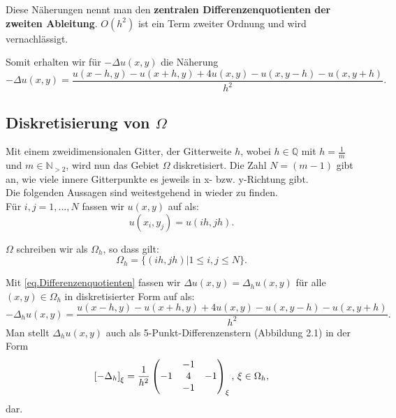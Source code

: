 Diese Näherungen nennt man den \textbf{zentralen Differenzenquotienten der zweiten Ableitung}. $O(h^{2})$ ist ein Term zweiter Ordnung und wird vernachlässigt.

Somit erhalten wir für $-\Delta u(x,y)$ die Näherung
\begin{equation}
-\Delta u(x,y) = \frac {u(x-h,y) - u(x+h,y) + 4u(x,y) - u(x,y-h) - u(x,y+h)} {h^{2}}.\label{eq.Differenzenquotienten}
\end{equation}

\subsection{Diskretisierung von $\Omega$}\label{ss.Diskretisierung}

Mit einem zweidimensionalen Gitter, der Gitterweite $h$, wobei $h \in \mathbb{Q}$ mit $h = \frac {1} {m}$ und $m \in \mathbb{N}_{>2}$, wird nun das Gebiet $\Omega$ diskretisiert. Die Zahl $N = (m-1)$ gibt an, wie viele innere Gitterpunkte es jeweils in x- bzw. y-Richtung gibt.\\
Die folgenden Aussagen sind weitestgehend in \cite[S. 470-472]{DR08} wieder zu finden.\\

Für $i,j = 1,...,N$ fassen wir $u(x,y)$ auf als:
\begin{equation}
u(x_{i},y_{j}) = u(ih,jh).
\end{equation}

$\Omega$ schreiben wir als $\Omega_{h}$, so dass gilt:
\begin{equation}
\Omega_{h} = \{(ih, jh) | 1 \le i,j \le N\}.
\end{equation}

\label{img.5-Point-Star}

Mit \autoref{eq.Differenzenquotienten} fassen wir $\Delta u(x,y) = \Delta_{h} u(x,y)$ für alle $(x,y) \in \Omega_{h}$ in diskretisierter Form auf als:
\begin{equation}
-\Delta_{h} u(x,y) = \frac {u(x-h,y) - u(x+h,y) + 4u(x,y) - u(x,y-h) - u(x,y+h)} {h^{2}}.\label{eq.5-Point-Star}
\end{equation}
Man stellt $\Delta_{h} u(x,y)$ auch als 5-Punkt-Differenzenstern (Abbildung 2.1) in der Form
\begin{equation}
\left[-\Delta_{h}\right]_{\xi} = \frac {1} {h^{2}}
\begin{pmatrix}
  & -1 & \\
-1 & 4 & -1 \\
  & -1 & 
\end{pmatrix}_{\xi}
\textnormal{, } \xi \in \Omega_{h},
\end{equation}
dar.

